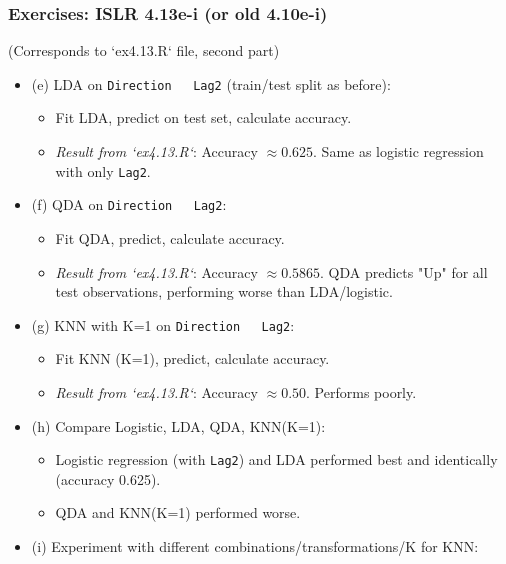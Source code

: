 \documentclass[12pt,a4paper]{article}
\newcommand{\Rcode}[1]{\texttt{#1}} %
\begin{document}
\begin{itemize}
    \subsubsection{Exercises: ISLR 4.13e-i (or old 4.10e-i)}
        (Corresponds to `ex4.13.R` file, second part)
        \begin{itemize}
            \item (e) LDA on \Rcode{Direction ~ Lag2} (train/test split as before):
                \begin{itemize}
                    \item Fit LDA, predict on test set, calculate accuracy.
                    \item \textit{Result from `ex4.13.R`}: Accuracy $\approx 0.625$. Same as logistic regression with only \Rcode{Lag2}.
                \end{itemize}
            \item (f) QDA on \Rcode{Direction ~ Lag2}:
                \begin{itemize}
                    \item Fit QDA, predict, calculate accuracy.
                    \item \textit{Result from `ex4.13.R`}: Accuracy $\approx 0.5865$. QDA predicts "Up" for all test observations, performing worse than LDA/logistic.
                \end{itemize}
            \item (g) KNN with K=1 on \Rcode{Direction ~ Lag2}:
                \begin{itemize}
                    \item Fit KNN (K=1), predict, calculate accuracy.
                    \item \textit{Result from `ex4.13.R`}: Accuracy $\approx 0.50$. Performs poorly.
                \end{itemize}
            \item (h) Compare Logistic, LDA, QDA, KNN(K=1):
                \begin{itemize}
                    \item Logistic regression (with \Rcode{Lag2}) and LDA performed best and identically (accuracy 0.625).
                    \item QDA and KNN(K=1) performed worse.
                \end{itemize}
            \item (i) Experiment with different combinations/transformations/K for KNN:
                \begin{itemize}

\end{itemize}
\end{itemize}
\end{itemize}
\end{document}
